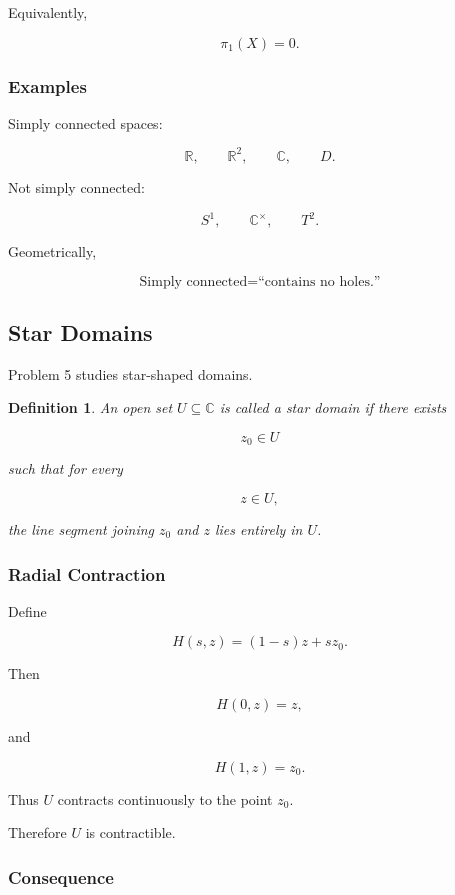 \documentclass[12pt,a4paper]{article}
\theoremstyle{notespace}
\newtheorem{definition}{Definition}[subsection]
\begin{document}
Equivalently,

\[
\pi_1(X)=0.
\]

\subsubsection*{Examples}

Simply connected spaces:

\[
\mathbb R,
\qquad
\mathbb R^2,
\qquad
\mathbb C,
\qquad
D.
\]

Not simply connected:

\[
S^1,
\qquad
\mathbb C^\times,
\qquad
T^2.
\]

Geometrically,

\[
\boxed{
	\text{Simply connected}
	=
	\text{``contains no holes.''}
}
\]

\subsection{Star Domains}

Problem 5 studies star-shaped domains.

\begin{definition}
	An open set \(U\subseteq\mathbb C\) is called a \emph{star domain} if there exists
	
	\[
	z_0\in U
	\]
	
	such that for every
	
	\[
	z\in U,
	\]
	
	the line segment joining \(z_0\) and \(z\) lies entirely in \(U\).
\end{definition}

\subsubsection*{Radial Contraction}

Define

\[
H(s,z)
=
(1-s)z+sz_0.
\]

Then

\[
H(0,z)=z,
\]

and

\[
H(1,z)=z_0.
\]

Thus \(U\) contracts continuously to the point \(z_0\).

Therefore \(U\) is contractible.

\subsubsection*{Consequence}
\end{document}
